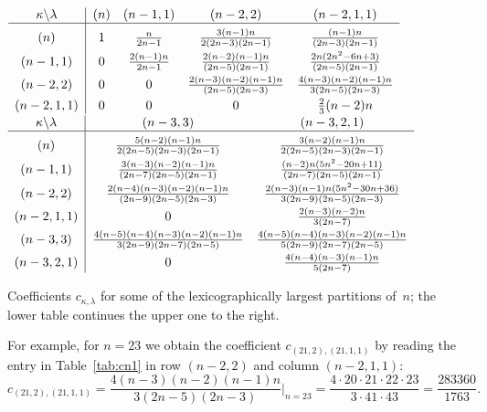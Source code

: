 \documentclass[smallextended]{svjour3}
\begin{document}
\begin{table}
\begin{center}
\parbox{0.85\textwidth}{
$
 \begin{array}{c@{\;\;}|@{\;\;}c@{\quad}c@{\quad}c@{\quad}c}
   \kappa\backslash\lambda & (n) & (n-1,1) & (n-2,2) & (n-2,1,1)\\
   \hline \rule{0pt}{14pt}
   (n) & 1 & \frac{n}{2n-1} & \frac{3(n-1)n}{2(2n-3)(2n-1)} & \frac{(n-1)n}{(2n-3)(2n-1)}\\[1ex]
   (n-1,1) & 0 & \frac{2(n-1)n}{2n-1} & \frac{2(n-2)(n-1)n}{(2n-5)(2n-1)} & \frac{2n(2n^{2}-6n+3)}{(2n-5)(2n-1)}\\[1ex]
   (n-2,2) & 0 & 0 & \frac{2(n-3)(n-2)(n-1)n}{(2n-5)(2n-3)} & \frac{4(n-3)(n-2)(n-1)n}{3(2n-5)(2n-3)}\\[1ex]
   (n-2,1,1) & 0 & 0 & 0 & \frac{2}{3}(n-2)n
 \end{array}
$ \\[1ex]
$
 \begin{array}{c@{\;\;}|@{\;\;}c@{\quad}c}
   \kappa\backslash\lambda & (n-3,3) & (n-3,2,1)\\
   \hline \rule{0pt}{14pt}
   (n) & \frac{5(n-2)(n-1)n}{2(2n-5)(2n-3)(2n-1)} & \frac{3(n-2)(n-1)n}{2(2n-5)(2n-3)(2n-1)}\\[1ex]
   (n-1,1) & \frac{3(n-3)(n-2)(n-1)n}{(2n-7)(2n-5)(2n-1)} & \frac{(n-2)n(5n^{2}-20n+11)}{(2n-7)(2n-5)(2n-1)}\\[1ex]
   (n-2,2) & \frac{2(n-4)(n-3)(n-2)(n-1)n}{(2n-9)(2n-5)(2n-3)} & \frac{2(n-3)(n-1)n(5n^{2}-30n+36)}{3(2n-9)(2n-5)(2n-3)}\\[1ex]
   (n-2,1,1) & 0 & \frac{2(n-3)(n-2)n}{3(2n-7)}\\[1ex]
   (n-3,3) & \frac{4(n-5)(n-4)(n-3)(n-2)(n-1)n}{3(2n-9)(2n-7)(2n-5)} & \frac{4(n-5)(n-4)(n-3)(n-2)(n-1)n}{5(2n-9)(2n-7)(2n-5)}\\[1ex]
   (n-3,2,1) & 0 & \frac{4(n-4)(n-3)(n-1)n}{5(2n-7)}
 \end{array}
$
}
\end{center}
\caption{Coefficients $c_{\kappa,\lambda}$ for some of the lexicographically
largest partitions of~$n$; the lower table continues the upper one
to the right.}
\label{tab:cn1} 
\end{table}
\begin{example}
For example, for $n=23$ we obtain the coefficient $c_{(21,2),(21,1,1)}$ by
reading the entry in Table~\ref{tab:cn1} in row $(n-2,2)$ and column
$(n-2,1,1)$:
\[
  c_{(21,2),(21,1,1)} = \frac{4 (n-3) (n-2) (n-1) n}{3 (2 n-5) (2 n-3)} \Bigg|_{n=23}
  = \frac{4 \cdot 20 \cdot 21 \cdot 22 \cdot 23}{3 \cdot 41 \cdot 43}
  = \frac{283360}{1763}.
\]
\end{example}
\end{document}
